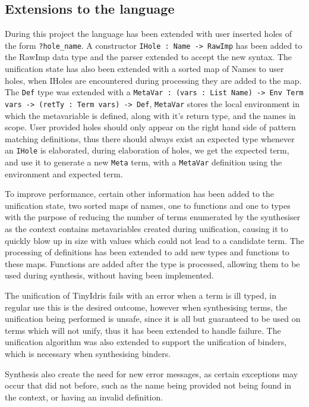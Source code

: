 \documentclass[a4paper]{article}
\begin{document}
\subsection{Extensions to the language}
\label{sec:org92a89c9}
During this project the language has been extended with user inserted
holes of the form \texttt{?hole\_name}.  A constructor
\texttt{IHole : Name -> RawImp} has been added to the RawImp 
data type and the parser extended to accept the new syntax. The 
unification state has also been extended with a sorted map of Names
to user holes, when IHoles are encountered during processing they are 
added to the map. The \texttt{Def} type was extended with a 
\texttt{MetaVar : (vars : List Name) -> Env Term vars ->
  (retTy : Term vars) -> Def}, \texttt{MetaVar} stores the local
environment in which the metavariable is defined, along with it's
return type, and the names in scope. User provided holes should only
appear on the right hand side of pattern matching definitions, thus
there should always exist an expected type whenever an \texttt{IHole}
is elaborated, during elaboration of holes, we get the expected term,
and use it to generate a new \texttt{Meta} term, with a \texttt{MetaVar} definition using the environment and expected term.

To improve performance, certain other information has been added to the unification state, two sorted maps of names, one to functions and one to types
with the purpose of reducing the number of terms enumerated by the synthesiser as the 
context contains metavariables created during unification, causing it to quickly blow up in size  with values which could not lead to 
a candidate term. 
The processing of definitions has been extended to add new types and functions to these maps. Functions are added 
after the type is processed, allowing them to be used during synthesis, without having been implemented. 

The unification of TinyIdris fails with an error when a term is ill typed, 
in regular use this is the desired outcome, however when synthesising 
terms, the unification being performed is unsafe, since it is all but
guaranteed to be used on terms which will not unify, thus it has been 
extended to handle failure. The unification algorithm was also extended
to support the unification of binders, which is necessary when 
synthesising binders.  

Synthesis also create the need for new error messages, as certain exceptions
may occur that did not before, such as the name being provided not being found in the context, 
or having an invalid definition.
\end{document}
